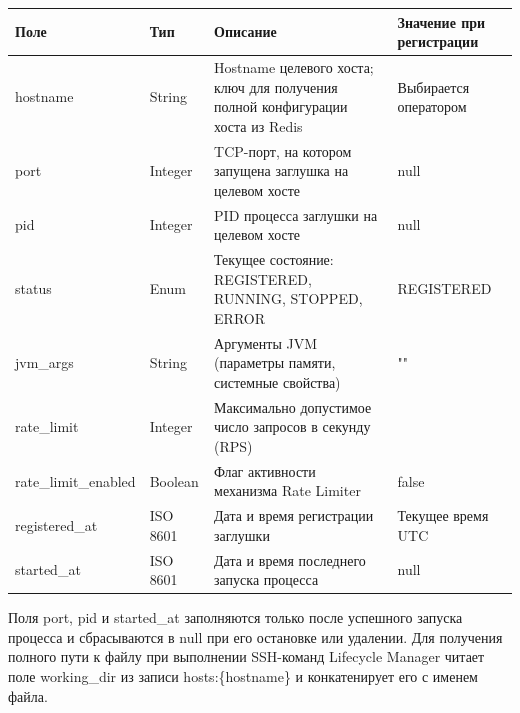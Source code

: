 \documentclass[
]{article}
\newcounter{none} %
\begin{document}
{\def\LTcaptype{none} %
\begin{longtable}[]{@{}
  >{\raggedright\arraybackslash}p{}
  >{\raggedright\arraybackslash}p{}
  >{\raggedright\arraybackslash}p{}
  >{\raggedright\arraybackslash}p{}@{}}
\toprule\noalign{}
\begin{minipage}[b]{\linewidth}\centering
\textbf{Поле}
\end{minipage} & \begin{minipage}[b]{\linewidth}\centering
\textbf{Тип}
\end{minipage} & \begin{minipage}[b]{\linewidth}\centering
\textbf{Описание}
\end{minipage} & \begin{minipage}[b]{\linewidth}\centering
\textbf{Значение при регистрации}
\end{minipage} \\
\midrule\noalign{}
\endhead
\bottomrule\noalign{}
\endlastfoot
hostname & String & Hostname целевого хоста; ключ для получения полной
конфигурации хоста из Redis & Выбирается оператором \\
port & Integer & TCP-порт, на котором запущена заглушка на целевом хосте
& null \\
pid & Integer & PID процесса заглушки на целевом хосте & null \\
status & Enum & Текущее состояние: REGISTERED, RUNNING, STOPPED, ERROR &
REGISTERED \\
jvm\_args & String & Аргументы JVM (параметры памяти, системные
свойства) & "" \\
rate\_limit & Integer & Максимально допустимое число запросов в секунду
(RPS) & 0 \\
rate\_limit\_enabled & Boolean & Флаг активности механизма Rate Limiter
& false \\
registered\_at & ISO 8601 & Дата и время регистрации заглушки & Текущее
время UTC \\
started\_at & ISO 8601 & Дата и время последнего запуска процесса &
null \\
\end{longtable}
}

Поля port, pid и started\_at заполняются только после успешного запуска
процесса и сбрасываются в null при его остановке или удалении. Для
получения полного пути к файлу при выполнении SSH-команд Lifecycle
Manager читает поле working\_dir из записи hosts:\{hostname\} и
конкатенирует его с именем файла.
\end{document}
